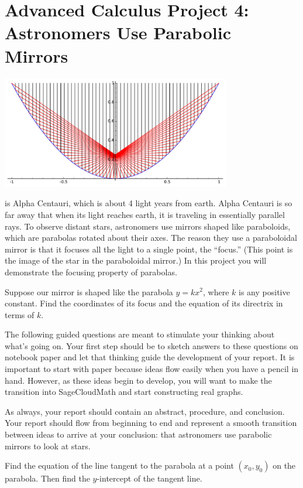 \documentclass
[justified,nohyper]
{tufte-handout}
\theoremstyle{mydef}
\begin{document}
\section{Advanced Calculus Project 4: Astronomers Use Parabolic Mirrors}

\includegraphics[width=10cm]{parabolic.pdf}

 is Alpha Centauri, which is about 4 light 
years from earth. Alpha Centauri is so far away that when its light reaches 
earth, it is traveling in essentially parallel rays. To observe distant stars, 
astronomers use mirrors shaped like paraboloids, which are parabolas rotated 
about their axes. The reason they use a paraboloidal mirror is that it focuses 
all the light to a single point, the ``focus.'' (This point is the image of the 
star in the paraboloidal mirror.) In this project you will demonstrate the 
focusing property of parabolas.

Suppose our mirror is shaped like the parabola $y=kx^2$, where $k$ is any 
positive constant. Find the coordinates of its focus and the equation of its 
directrix in terms of $k$.

The following guided questions are meant to stimulate your thinking about what's 
going on. Your first step should be to sketch answers to these questions on 
notebook paper and let that thinking guide the development of your report. It is 
important to start with paper because ideas flow easily when you have a pencil in 
hand. However, as these ideas begin to develop, you will want to make the 
transition into SageCloudMath and start constructing real graphs.

As always, your report should contain an abstract, procedure, and conclusion. 
Your report should flow from beginning to end and represent a smooth transition 
between ideas to arrive at your conclusion: that astronomers use parabolic 
mirrors to look at stars.

Find the equation of the line tangent to the parabola at a point $(x_0,y_0)$ on 
the parabola. Then find the $y$-intercept of the tangent line.
\end{document}
